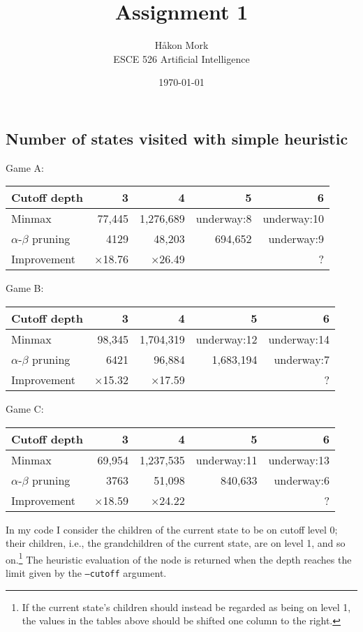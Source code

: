 \documentclass[letterpaper, 12pt]{article}
\title{\textbf{Assignment 1}}
\author{Håkon Mork \\ ESCE 526 Artificial Intelligence}
\date{\today}
\numberwithin{theorem}{section}
\begin{document}
\maketitle
\noindent

\section{}
\subsection{Number of states visited with simple heuristic}
Game A:
\begin{table}[h]
	\centering
	\small
	\begin{tabular}{lrrrr}
		Cutoff depth & 3 & 4 & 5 & 6 \\
		\midrule
		Minmax & 77,445 & 1,276,689 & underway:8 & underway:10 \\
		$\alpha$-$\beta$ pruning & 4129 & 48,203 & 694,652 & underway:9 \\
		\midrule
		Improvement & $\times$18.76 & $\times$26.49 & & ?
	\end{tabular}
\end{table}

\noindent Game B:
\begin{table}[h]
	\centering
	\small
	\begin{tabular}{lrrrr}
		Cutoff depth & 3 & 4 & 5 & 6 \\
		\midrule
		Minmax & 98,345 & 1,704,319 & underway:12 & underway:14 \\
		$\alpha$-$\beta$ pruning & 6421 & 96,884 & 1,683,194 & underway:7 \\
		\midrule
		Improvement & $\times$15.32 & $\times$17.59 & & ?
	\end{tabular}
\end{table}

\noindent Game C:
\begin{table}[h]
	\centering
	\small
	\begin{tabular}{lrrrr}
		Cutoff depth & 3 & 4 & 5 & 6 \\
		\midrule
		Minmax & 69,954 & 1,237,535 & underway:11 & underway:13 \\
		$\alpha$-$\beta$ pruning & 3763 & 51,098 & 840,633 & underway:6 \\
		\midrule
		Improvement & $\times$18.59 & $\times$24.22 & & ?
	\end{tabular}
\end{table}

In my code I consider the children of the current state to be on cutoff level 0; their children, i.e., the grandchildren of the current state, are on level 1, and so on.\footnote{If the current state's children should instead be regarded as being on level 1, the values in the tables above should be shifted one column to the right.} The heuristic evaluation of the node is returned when the depth reaches the limit given by the \texttt{--cutoff} argument. 
\end{document}
